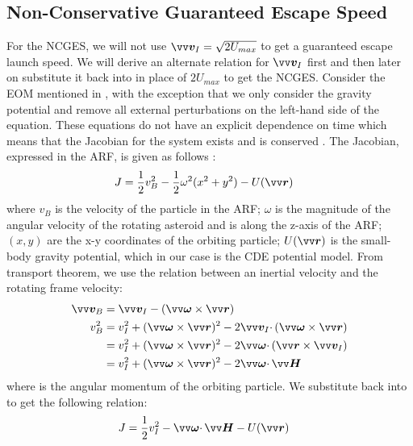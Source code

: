 \subsection{Non-Conservative Guaranteed Escape Speed}
\label{subsec:non_conservative_escape_derivation}
For the \gls{NCGES}, we will not use $\bv{v}_I = \sqrt{2U_{max}}$ to get a guaranteed escape launch speed. We will derive an alternate relation for $\bv{v}_I$ first and then later on substitute it back into  in place of $2U_{max}$ to get the \gls{NCGES}.
%
\newline\newline
%
Consider the \gls{EOM} mentioned in , with the exception that we only consider the gravity potential and remove all external perturbations on the left-hand side of the equation. These equations do not have an explicit dependence on time which means that the Jacobian for the system exists and is conserved \parencite{scheeresBook}. The Jacobian, expressed in the \gls{ARF}, is given as follows \parencite{scheeresBook}:
\begin{align}
    J &= \frac{1}{2} v_B^2 - \frac{1}{2} \omega^2(x^2 + y^2) - U(\bv{r})
    \label{eqn:jacobian}
\end{align}
where $v_B$ is the velocity of the particle in the \gls{ARF}; $\omega$ is the magnitude of the angular velocity of the rotating asteroid and is along the z-axis of the \gls{ARF}; $(x,y)$ are the x-y coordinates of the orbiting particle; $U(\bv{r})$ is the small-body gravity potential, which in our case is the \gls{CDE} potential model. From transport theorem, we use the relation between an inertial velocity and the rotating frame velocity:
\begin{align}
    \bv{v}_B &= \bv{v}_I - (\bv{\omega} \times \bv{r}) \\
    v_B^2 &= v_I^2 + (\bv{\omega} \times \bv{r})^2 - 2 \bv{v}_I \cdotp (\bv{\omega} \times \bv{r}) \nonumber \\
    &= v_I^2 + (\bv{\omega} \times \bv{r})^2 - 2 \bv{\omega} \cdotp (\bv{r} \times \bv{v}_I) \nonumber \\
    &= v_I^2 + (\bv{\omega} \times \bv{r})^2 - 2 \bv{\omega} \cdotp \bv{H}
    \label{eqn:arf_velocity_modified_with_H}
\end{align}
where  is the angular momentum of the orbiting particle. We substitute  back into  to get the following relation:
\begin{align}
    J &= \frac{1}{2} v_I^2 - \bv{\omega} \cdotp \bv{H} - U(\bv{r})
    \label{eqn:jacobian_mod}
\end{align}
